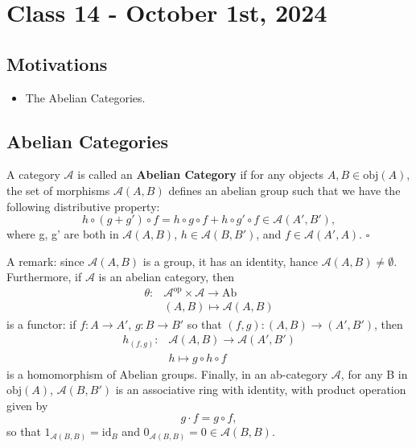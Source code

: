 \documentclass[../category_theory.tex]{subfiles}
\begin{document}
\section{Class 14 - October 1st, 2024}
\subsection{Motivations}
\begin{itemize}
	\item The Abelian Categories.
\end{itemize}
\subsection{Abelian Categories}
\begin{def*}
	A category \(\mathcal{A}\) is called an \textbf{Abelian Category} if for any objects \(A, B\in \mathrm{obj}(A)\), the set of morphisms \(\mathcal{A}(A, B)\) defines an abelian group such that
	we have the following distributive property:
	\[
		h\circ (g+g')\circ f = h\circ g\circ f + h\circ g'\circ f\in \mathcal{A}(A', B'),
	\]
	where g, g' are both in \(\mathcal{A}(A, B)\), \(h\in \mathcal{A}(B, B') \), and \(f\in \mathcal{A}(A', A)\). \(\square\)
\end{def*}
A remark: since \(\mathcal{A}(A, B)\) is a group, it has an identity, hance \(\mathcal{A}(A, B)\neq\emptyset\). Furthermore, if \(\mathcal{A}\) is an abelian category, then
\begin{align*}
	\theta : & \mathcal{A}^{\mathrm{op}}\times \mathcal{A}\rightarrow \mathrm{Ab} \\
	         & (A, B)\mapsto \mathcal{A}(A, B)
\end{align*}
is a functor: if \(f:A\rightarrow A'\), \(g:B\rightarrow B'\) so that \((f, g):(A, B)\rightarrow (A', B')\), then
\begin{align*}
	h_{(f, g)}: & \mathcal{A}(A, B)\rightarrow \mathcal{A}(A', B') \\
	            & h\mapsto g\circ h\circ f
\end{align*}
is a homomorphism of Abelian groups. Finally, in an ab-category \( \mathcal{A}\), for any B in \(\mathrm{obj}(A)\), \(\mathcal{A}(B, B')\) is an associative ring with identity, with product operation given by
\[
	g \cdot f = g\circ f,
\]
so that \(1_{\mathcal{A}(B, B)}=\mathrm{id}_{B}\) and \(0_{\mathcal{A}(B, B)}=0\in \mathcal{A}(B, B)\).
\end{document}
